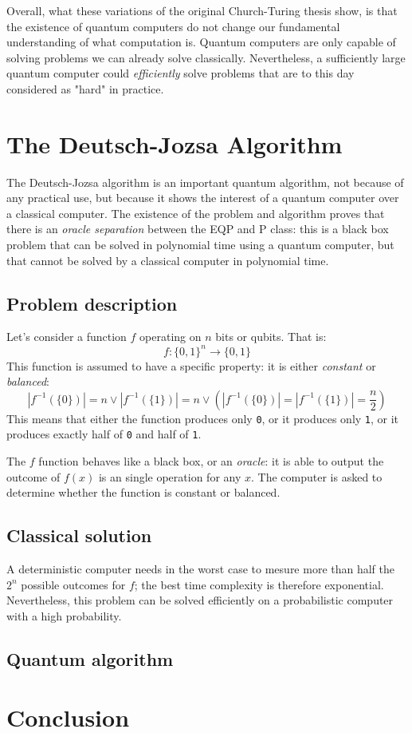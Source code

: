 \documentclass[12pt,a4paper]{article}
\theoremstyle{plain}
\theoremstyle{definition}
\begin{document}
Overall, what these variations of the original Church-Turing thesis show, is that the existence of quantum computers do not change our fundamental understanding of what computation is. Quantum computers are only capable of solving problems we can already solve classically. Nevertheless, a sufficiently large quantum computer could \emph{efficiently} solve problems that are to this day considered as "hard" in practice. 

\section{The Deutsch-Jozsa Algorithm}
The Deutsch-Jozsa algorithm\cite{deutsch-jozsa} is an important quantum algorithm, not because of any practical use, but because it shows the interest of a quantum computer over a classical computer. The existence of the problem and algorithm proves that there is an \emph{oracle separation} between the EQP and P class: this is a black box problem that can be solved in polynomial time using a quantum computer, but that cannot be solved by a classical computer in polynomial time.

\subsection{Problem description}
Let's consider a function $f$ operating on $n$ bits or qubits. That is:
\begin{equation*}
    f : \{ 0, 1 \}^n \to \{ 0, 1 \}
\end{equation*}
This function is assumed to have a specific property: it is either \emph{constant} or \emph{balanced}:
\begin{equation*}
    |f^{-1}(\{0\})| = n \lor |f^{-1}(\{1\})| = n \lor \left(|f^{-1}(\{0\})| = |f^{-1}(\{1\})| = \frac{n}{2}\right)
\end{equation*}
This means that either the function produces only \texttt{0}, or it produces only \texttt{1}, or it produces exactly half of \texttt{0} and half of \texttt{1}.

The $f$ function behaves like a black box, or an \emph{oracle}: it is able to output the outcome of $f(x)$ is an single operation for any $x$. The computer is asked to determine whether the function is constant or balanced.

\subsection{Classical solution}
A deterministic computer needs in the worst case to mesure more than half the $2^n$ possible outcomes for $f$; the best time complexity is therefore exponential. Nevertheless, this problem can be solved efficiently on a probabilistic computer with a high probability.

\subsection{Quantum algorithm}

\section*{Conclusion}

\nocite{*}
\printbibliography
\end{document}
